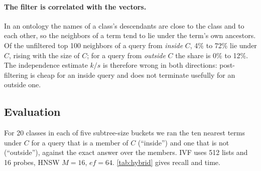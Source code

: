 \documentclass[sigconf, nonacm]{acmart}
\begin{document}
\paragraph{The filter is correlated with the vectors.} In an ontology the names of a class's descendants are close to the class and to each other, so the neighbors of a term tend to lie under the term's own ancestors. Of the unfiltered top 100 neighbors of a query from \emph{inside} $C$, 4\% to 72\% lie under $C$, rising with the size of $C$; for a query from \emph{outside} $C$ the share is 0\% to 12\%. The independence estimate $k/s$ is therefore wrong in both directions: post-filtering is cheap for an inside query and does not terminate usefully for an outside one.

\subsection{Evaluation}

For 20 classes in each of five subtree-size buckets we ran the ten nearest terms under $C$ for a query that is a member of $C$ (``inside'') and one that is not (``outside''), against the exact answer over the members. IVF uses 512 lists and 16 probes, HNSW $M{=}16$, $ef{=}64$. \autoref{tab:hybrid} gives recall and time.
\end{document}
